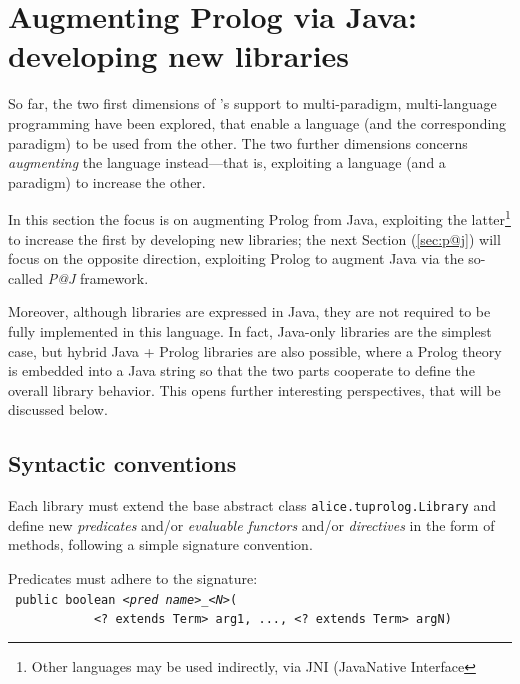 \section{Augmenting Prolog via Java:\\developing new libraries}
\label{sec:howto-develop-libraries}

So far, the two first dimensions of \tuprolog{}'s support to multi-paradigm, multi-language programming have been explored, that enable a language (and the corresponding paradigm) to be used from the other.
The two further dimensions concerns \textit{augmenting} the language instead---that is, exploiting a language (and a paradigm) to increase the other.

In this section the focus is on augmenting Prolog from Java, exploiting the latter\footnote{%
 Other languages may be used indirectly, via JNI (JavaNative Interface}
to increase the first by developing new \tuprolog{} libraries; the next Section (\ref{sec:p@j}) will focus on the opposite direction, exploiting Prolog to augment Java via the so-called \textit{P@J} framework.

Moreover, although \tuprolog{} libraries are expressed in Java, they are not required to
be fully implemented in this language.
%
In fact, Java-only libraries are the simplest case, but hybrid Java + Prolog libraries are also possible, where a Prolog theory is embedded into a Java string so that the
two parts cooperate to define the overall library behavior.
This opens further interesting perspectives, that will be discussed below.

\subsection{Syntactic conventions}
\label{ssec:library-syntax}
Each library must extend the base abstract class \texttt{alice.tuprolog.Library} and define new \textit{predicates} and/or \textit{evaluable functors} and/or \textit{directives} in the form of methods, following a simple signature convention.

\noindent Predicates must adhere to the signature:\\

{\small\tt
    public boolean <\textit{pred name}>\_<\textit{N}>(\\
    \mbox{~~~~~~~~~~~~}<?~extends~Term> arg1, ..., <?~extends~Term> argN)
}\\

